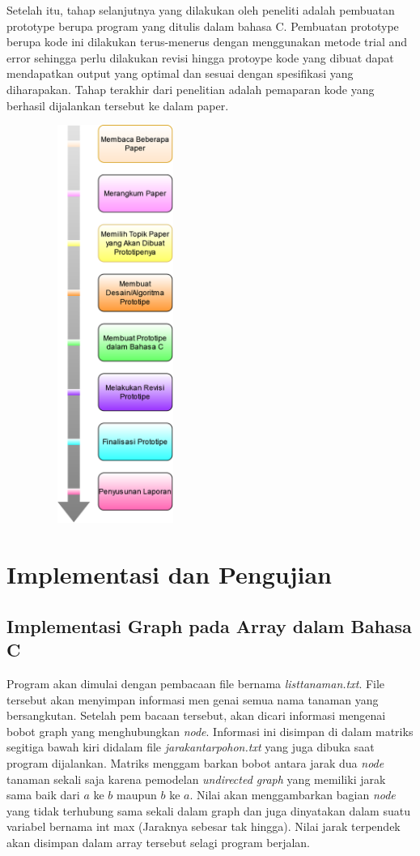 \documentclass[conference]{IEEEtran}
\begin{document}
Setelah itu, tahap selanjutnya yang dilakukan oleh peneliti adalah pembuatan prototype berupa program yang ditulis dalam bahasa C.
Pembuatan prototype berupa kode ini dilakukan terus-menerus dengan menggunakan metode trial and error sehingga perlu dilakukan revisi hingga protoype kode yang dibuat dapat mendapatkan output yang optimal dan sesuai dengan spesifikasi yang diharapakan.
Tahap terakhir dari penelitian adalah pemaparan kode yang berhasil dijalankan tersebut ke dalam paper.
\begin{figure}[h]
    \includegraphics[width = 5cm, height = 13cm]{Flow_diagram.png}
    \centering
\end{figure}

\section{Implementasi dan Pengujian}
\subsection{Implementasi Graph pada Array dalam Bahasa C}
Program akan dimulai dengan pembacaan file bernama \textit{listtanaman.txt}. 
File tersebut akan menyimpan informasi men genai semua nama tanaman yang bersangkutan. 
Setelah pem bacaan tersebut, akan dicari informasi mengenai bobot graph yang menghubungkan \textit{node}.
Informasi ini disimpan di dalam matriks segitiga bawah kiri didalam file \textit{jarakantarpohon.txt} yang juga dibuka saat program dijalankan.
Matriks menggam barkan bobot antara jarak dua \textit{node} tanaman sekali saja karena pemodelan \textit{undirected graph} yang memiliki jarak sama baik dari $a$ ke $b$ maupun $b$ ke $a$.
Nilai  akan menggambarkan bagian \textit{node} yang tidak terhubung sama sekali dalam graph dan juga dinyatakan dalam suatu variabel bernama int max (Jaraknya sebesar tak hingga).
Nilai jarak terpendek akan disimpan dalam array tersebut selagi program berjalan.
\end{document}
